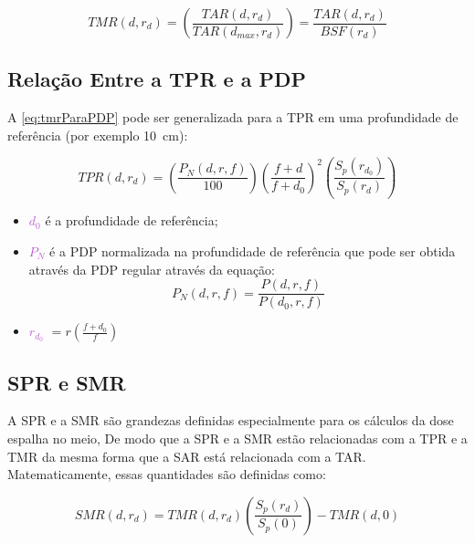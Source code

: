 \documentclass[11pt,a4paper]{article}
\newcounter{exemplo}
\begin{document}
        \begin{equation}
            TMR(d,r_d) = \left(\frac{TAR(d, r_d)}{TAR(d_{max}, r_d)}\right) = \frac{TAR(d,r_d)}{BSF(r_d)}
            \label{eq:tmrTar}
        \end{equation}

    \subsection{Relação Entre a TPR e a PDP}

    A \ref{eq:tmrParaPDP} pode ser generalizada para a TPR em uma profundidade de referência (por exemplo \qty{10}{cm}):

        \begin{equation}
            TPR(d, r_d) =  \left(\frac{P_N(d, r, f)}{100}\right) \left(\frac{f + d}{f + d_0}\right)^2 \left(\frac{S_p(r_{d_0})}{S_p(r_d)}\right)
        \end{equation}

    \begin{exemplo}[onde:]
        \begin{itemize}
            \item \textcolor{MediumOrchid}{$d_0$} é a profundidade de referência;
            \item \textcolor{MediumOrchid}{$P_N$} é a PDP normalizada na profundidade de referência que pode ser obtida através da PDP regular através da equação: 
            $$P_N(d, r, f) = \frac{P(d, r, f)}{P(d_0, r, f)}$$
            \item \textcolor{MediumOrchid}{$r_{d_0}$} $= r\left(\frac{f + d_0}{f}\right)$
        \end{itemize}
    \end{exemplo}

    \subsection{SPR e SMR}

    A SPR e a SMR são grandezas definidas especialmente para os cálculos da dose espalha no meio, De modo que a SPR e a SMR estão relacionadas com a TPR e a TMR da mesma forma que a SAR está relacionada com a TAR.  Matematicamente, essas quantidades são definidas como:

        \begin{equation}
            SMR(d, r_d) = TMR(d, r_d) \left(\frac{S_p(r_d)}{S_p(0)}\right) - TMR(d,0)
            \label{eq:smrTmr}
        \end{equation}
\end{document}
